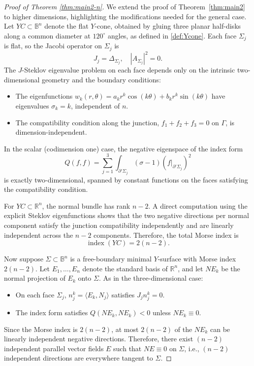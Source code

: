 \documentclass[10pt,a4paper]{amsart}
\begin{document}
\begin{proof}[Proof of Theorem \ref{thm:main2-n}]
We extend the proof of Theorem~\ref{thm:main2} to higher dimensions, highlighting the modifications needed for the general case.  \\ 
Let $YC \subset \mathbb{B}^n$ denote the flat $Y$-cone, obtained by gluing three planar half-disks along a common diameter at $120^\circ$ angles, as defined in \ref{def:Ycone}. Each face $\Sigma_j$ is flat, so the Jacobi operator on $\Sigma_j$ is
\[
J_j = \Delta_{\Sigma_j}, \quad |A_{\Sigma_j}|^2 = 0.
\]
The $J$-Steklov eigenvalue problem on each face depends only on the intrinsic two-dimensional geometry and the boundary conditions:
\begin{itemize}
    \item The eigenfunctions $w_k(r,\theta) = a_k r^k \cos(k\theta) + b_k r^k \sin(k\theta)$ have eigenvalues $\sigma_k = k$, independent of $n$.
    \item The compatibility condition along the junction, $f_1 + f_2 + f_3 = 0$ on $\Gamma$, is dimension-independent.
\end{itemize}

In the scalar (codimension one) case, the negative eigenspace of the index form
\[
Q(f,f) = \sum_{j=1}^3 \int_{\partial' \Sigma_j} (\sigma - 1) (f|_{\partial' \Sigma_j})^2
\]
is exactly two-dimensional, spanned by constant functions on the faces satisfying the compatibility condition.  

For $YC \subset \mathbb{R}^n$, the normal bundle has rank $n-2$. A direct computation using the explicit Steklov eigenfunctions shows that the two negative directions per normal component satisfy the junction compatibility independently and are linearly independent across the $n-2$ components. Therefore, the total Morse index is
\[
\operatorname{index}(YC) = 2(n-2).
\]

Now suppose $\Sigma \subset \mathbb{B}^n$ is a free-boundary minimal $Y$-surface with Morse index $2(n-2)$. Let $E_1,\dots,E_n$ denote the standard basis of $\mathbb{R}^n$, and let $NE_k$ be the normal projection of $E_k$ onto $\Sigma$. As in the three-dimensional case:
\begin{itemize}
    \item On each face $\Sigma_j$, $n^k_j = \langle E_k, N_j \rangle$ satisfies $J_j n^k_j = 0$.
    \item The index form satisfies $Q(NE_k,NE_k) < 0$ unless $NE_k \equiv 0$.
\end{itemize}
Since the Morse index is $2(n-2)$, at most $2(n-2)$ of the $NE_k$ can be linearly independent negative directions. Therefore, there exist $(n-2)$ independent parallel vector fields $E$ such that $NE \equiv 0$ on $\Sigma$, i.e., $(n-2)$ independent directions are everywhere tangent to $\Sigma$.  


\end{proof}
\end{document}
